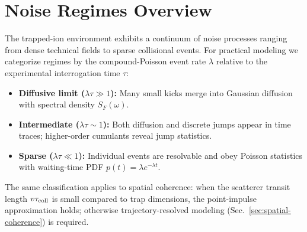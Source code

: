 \section{Noise Regimes Overview}
The trapped-ion environment exhibits a continuum of noise processes ranging from dense technical fields to sparse collisional events.
For practical modeling we categorize regimes by the compound-Poisson event rate $\lambda$ relative to the experimental interrogation time $\tau$:
\begin{itemize}
  \item \textbf{Diffusive limit ($\lambda\tau \gg 1$):} Many small kicks merge into Gaussian diffusion with spectral density $S_F(\omega)$.
  \item \textbf{Intermediate ($\lambda\tau \sim 1$):} Both diffusion and discrete jumps appear in time traces; higher-order cumulants reveal jump statistics.
  \item \textbf{Sparse ($\lambda\tau \ll 1$):} Individual events are resolvable and obey Poisson statistics with waiting-time PDF $p(t) = \lambda e^{-\lambda t}$.
\end{itemize}
The same classification applies to spatial coherence: when the scatterer transit length $v\tau_{\rm coll}$ is small compared to trap dimensions, the point-impulse approximation holds; otherwise trajectory-resolved modeling (Sec.~\ref{sec:spatial-coherence}) is required.
